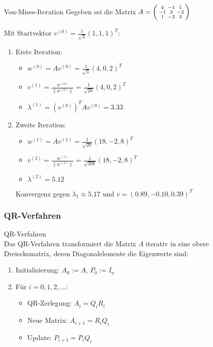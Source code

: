 \begin{example2}{Von-Mises-Iteration}
Gegeben sei die Matrix
$A = \begin{psmallmatrix} 
4 & -1 & 1 \\
-1 & 3 & -2 \\
1 & -2 & 3
\end{psmallmatrix}$

Mit Startvektor $v^{(0)} = \frac{1}{\sqrt{3}}(1,1,1)^T$:

\begin{enumerate}
    \item Erste Iteration:
    \begin{itemize}
        \item $w^{(0)} = Av^{(0)} = \frac{1}{\sqrt{3}}(4,0,2)^T$
        \item $v^{(1)} = \frac{w^{(0)}}{\|w^{(0)}\|} = \frac{1}{\sqrt{20}}(4,0,2)^T$
        \item $\lambda^{(1)} = (v^{(0)})^TAv^{(0)} = 3.33$
    \end{itemize}

    \item Zweite Iteration:
    \begin{itemize}
        \item $w^{(1)} = Av^{(1)} = \frac{1}{\sqrt{20}}(18,-2,8)^T$
        \item $v^{(2)} = \frac{w^{(1)}}{\|w^{(1)}\|} = \frac{1}{\sqrt{388}}(18,-2,8)^T$
        \item $\lambda^{(2)} = 5.12$
    \end{itemize}

Konvergenz gegen $\lambda_1 \approx 5.17$ und $v = (0.89, -0.10, 0.39)^T$
\end{enumerate}
\end{example2}

\subsubsection{QR-Verfahren}

\begin{concept}{QR-Verfahren}\\
Das QR-Verfahren transformiert die Matrix $A$ iterativ in eine obere Dreiecksmatrix, deren Diagonalelemente die Eigenwerte sind:
\begin{enumerate}
    \item Initialisierung: $A_0 := A$, $P_0 := I_n$
    \item Für $i = 0,1,2,\ldots$:
    \begin{itemize}
        \item QR-Zerlegung: $A_i = Q_iR_i$
        \item Neue Matrix: $A_{i+1} = R_iQ_i$
        \item Update: $P_{i+1} = P_iQ_i$
    \end{itemize}
\end{enumerate}
\end{concept}

